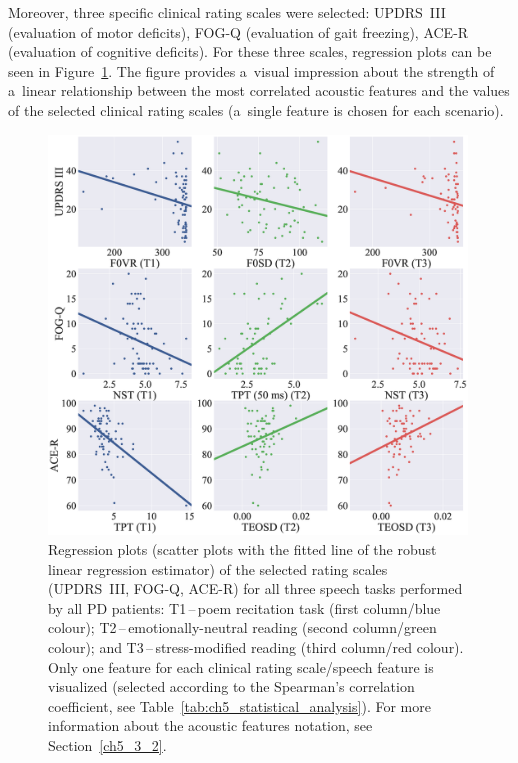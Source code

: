 Moreover, three specific clinical rating scales were selected: UPDRS~III (evaluation of motor deficits), FOG-Q (evaluation of gait freezing), ACE-R (evaluation of cognitive deficits). For these three scales, regression plots can be seen in Figure~\ref{fig:ch5_correlation_plots}. The figure provides a~visual impression about the strength of a~linear relationship between the most correlated acoustic features and the values of the selected clinical rating scales (a~single feature is chosen for each scenario). 

\begin{figure}[htb!]
	\centering
	\scriptsize
	\includegraphics[width=0.99\textwidth]{pictures/ch5_correlation_plots.eps}
	\caption[Regression plots for UPDRS~III, FOG-Q, and ACE-R.]{Regression plots (scatter plots with the fitted line of the robust linear regression estimator) of the selected rating scales (UPDRS~III, FOG-Q, ACE-R) for all three speech tasks performed by all PD patients: T1\,--\,poem recitation task (first column/blue colour); T2\,--\,emotionally-neutral reading (second column/green colour); and T3\,--\,stress-modified reading (third column/red colour). Only one feature for each clinical rating scale/speech feature is visualized (selected according to the Spearman's correlation coefficient, see Table~\ref{tab:ch5_statistical_analysis}). For more information about the acoustic features notation, see Section~\ref{ch5_3_2}.}
	\label{fig:ch5_correlation_plots}
\end{figure}

